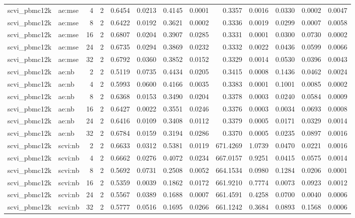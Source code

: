 \begin{tabular}{llrrrrrrrrrrr}
scvi\_pbmc12k & ae:mse & 4 & 2 & 0.6454 & 0.0213 & 0.4145 & 0.0001 & 0.3357 & 0.0016 & 0.0330 & 0.0002 & 0.0047 \\
scvi\_pbmc12k & ae:mse & 8 & 2 & 0.6422 & 0.0192 & 0.3621 & 0.0002 & 0.3336 & 0.0019 & 0.0299 & 0.0007 & 0.0058 \\
scvi\_pbmc12k & ae:mse & 16 & 2 & 0.6807 & 0.0204 & 0.3907 & 0.0285 & 0.3331 & 0.0001 & 0.0300 & 0.0730 & 0.0002 \\
scvi\_pbmc12k & ae:mse & 24 & 2 & 0.6735 & 0.0294 & 0.3869 & 0.0232 & 0.3332 & 0.0022 & 0.0436 & 0.0599 & 0.0066 \\
scvi\_pbmc12k & ae:mse & 32 & 2 & 0.6792 & 0.0360 & 0.3852 & 0.0152 & 0.3329 & 0.0014 & 0.0530 & 0.0396 & 0.0043 \\
scvi\_pbmc12k & ae:nb & 2 & 2 & 0.5119 & 0.0735 & 0.4434 & 0.0205 & 0.3415 & 0.0008 & 0.1436 & 0.0462 & 0.0024 \\
scvi\_pbmc12k & ae:nb & 4 & 2 & 0.5993 & 0.0600 & 0.4166 & 0.0035 & 0.3383 & 0.0001 & 0.1001 & 0.0085 & 0.0002 \\
scvi\_pbmc12k & ae:nb & 8 & 2 & 0.6368 & 0.0153 & 0.3490 & 0.0204 & 0.3378 & 0.0003 & 0.0240 & 0.0584 & 0.0009 \\
scvi\_pbmc12k & ae:nb & 16 & 2 & 0.6427 & 0.0022 & 0.3551 & 0.0246 & 0.3376 & 0.0003 & 0.0034 & 0.0693 & 0.0008 \\
scvi\_pbmc12k & ae:nb & 24 & 2 & 0.6416 & 0.0109 & 0.3408 & 0.0112 & 0.3379 & 0.0005 & 0.0171 & 0.0329 & 0.0014 \\
scvi\_pbmc12k & ae:nb & 32 & 2 & 0.6784 & 0.0159 & 0.3194 & 0.0286 & 0.3370 & 0.0005 & 0.0235 & 0.0897 & 0.0016 \\
scvi\_pbmc12k & scvi:nb & 2 & 2 & 0.6633 & 0.0312 & 0.5381 & 0.0119 & 671.4269 & 1.0739 & 0.0470 & 0.0221 & 0.0016 \\
scvi\_pbmc12k & scvi:nb & 4 & 2 & 0.6662 & 0.0276 & 0.4072 & 0.0234 & 667.0157 & 0.9251 & 0.0415 & 0.0575 & 0.0014 \\
scvi\_pbmc12k & scvi:nb & 8 & 2 & 0.5692 & 0.0731 & 0.2508 & 0.0052 & 664.1534 & 0.0980 & 0.1284 & 0.0206 & 0.0001 \\
scvi\_pbmc12k & scvi:nb & 16 & 2 & 0.5359 & 0.0039 & 0.1862 & 0.0172 & 661.9210 & 0.7774 & 0.0073 & 0.0923 & 0.0012 \\
scvi\_pbmc12k & scvi:nb & 24 & 2 & 0.5567 & 0.0389 & 0.1688 & 0.0007 & 661.4591 & 0.4258 & 0.0700 & 0.0040 & 0.0006 \\
scvi\_pbmc12k & scvi:nb & 32 & 2 & 0.5777 & 0.0516 & 0.1695 & 0.0266 & 661.1242 & 0.3684 & 0.0893 & 0.1568 & 0.0006 \\

\end{tabular}

